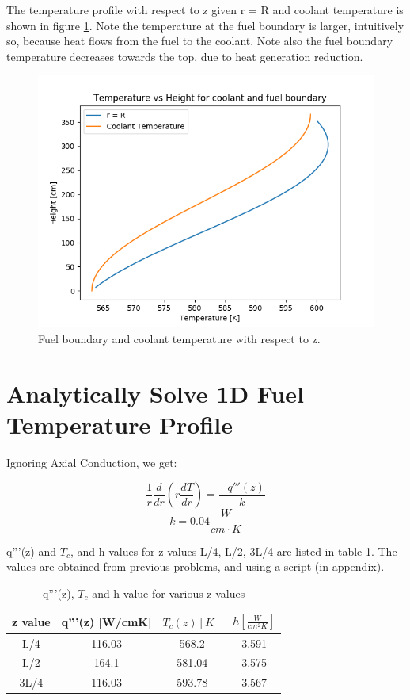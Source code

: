 \documentclass[12pt,letterpaper]{article}
\begin{document}
The temperature profile with respect to z given r = R and coolant temperature is shown
in figure \ref{fig:numer3}. Note the temperature at the fuel boundary is larger, intuitively
so, because heat flows from the fuel to the coolant. Note also the fuel boundary temperature
decreases towards the top, due to heat generation reduction.


\begin{figure}[htbp!]
    \begin{center}
        \includegraphics[scale=0.7]{fuel_bound.png}
    \end{center}
    \caption{Fuel boundary and coolant temperature with respect to z.}
    \label{fig:numer3}
\end{figure}

\pagebreak

\section*{Analytically Solve 1D Fuel Temperature Profile}
Ignoring Axial Conduction, we get:

\[\frac{1}{r} \frac{d}{dr} (r \frac{dT}{dr}) = \frac{-q'''(z)}{k}\]
\[k = 0.04 \frac{W}{cm\cdot K}\]

q'''(z) and $T_c$, and h  values for z values L/4, L/2, 3L/4 are listed in table \ref{tab:q_vol}.
The values are obtained from previous problems, and using a script (in appendix).


\begin{table}[h]
     \centering
    \begin{tabular}{cccc}
       \hline
       z value & q'''(z) [W/cmK] & $T_c(z) [K]$ & $h [\frac{W}{cm^2 K}] $ \\
       \hline
       L/4 & 116.03 & 568.2 & 3.591 \\
       L/2 & 164.1 & 581.04 & 3.575 \\
       3L/4 & 116.03 & 593.78 & 3.567 \\
       \hline
    \end{tabular}
    \caption {q'''(z), $T_c$ and h value for various z values}
    \label{tab:q_vol}
\end{table}
\end{document}
